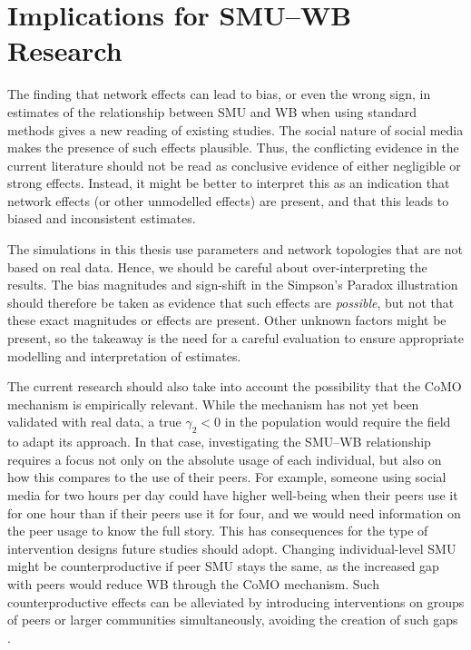 \section{Implications for SMU--WB Research}
\label{sec:discussion_conclusion:implications}
The finding that network effects can lead to bias, or even the wrong sign, in estimates of the relationship between SMU and WB when using standard methods gives a new reading of existing studies. The social nature of social media makes the presence of such effects plausible. Thus, the conflicting evidence in the current literature should not be read as conclusive evidence of either negligible or strong effects. Instead, it might be better to interpret this as an indication that network effects (or other unmodelled effects) are present, and that this leads to biased and inconsistent estimates.

The simulations in this thesis use parameters and network topologies that are not based on real data. Hence, we should be careful about over-interpreting the results. The bias magnitudes and sign-shift in the Simpson's Paradox illustration should therefore be taken as evidence that such effects are \emph{possible}, but not that these exact magnitudes or effects are present. Other unknown factors might be present, so the takeaway is the need for a careful evaluation to ensure appropriate modelling and interpretation of estimates.

The current research should also take into account the possibility that the CoMO mechanism is empirically relevant. While the mechanism has not yet been validated with real data, a true $\gamma_2 < 0$ in the population would require the field to adapt its approach. In that case, investigating the SMU--WB relationship requires a focus not only on the absolute usage of each individual, but also on how this compares to the use of their peers. For example, someone using social media for two hours per day could have higher well-being when their peers use it for one hour than if their peers use it for four, and we would need information on the peer usage to know the full story. This has consequences for the type of intervention designs future studies should adopt. Changing individual-level SMU might be counterproductive if peer SMU stays the same, as the increased gap with peers would reduce WB through the CoMO mechanism. Such counterproductive effects can be alleviated by introducing interventions on groups of peers or larger communities simultaneously, avoiding the creation of such gaps \parencite[Sec.~2.2]{HudgensHalloran2008}.

